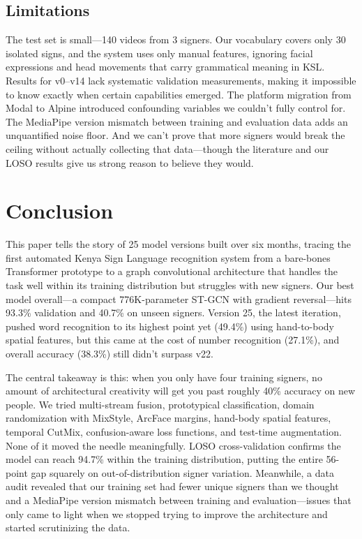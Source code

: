 \documentclass[conference]{IEEEtran}
\begin{document}
\subsection{Limitations}

The test set is small---140 videos from 3 signers. Our vocabulary covers only 30 isolated signs, and the system uses only manual features, ignoring facial expressions and head movements that carry grammatical meaning in KSL. Results for v0--v14 lack systematic validation measurements, making it impossible to know exactly when certain capabilities emerged. The platform migration from Modal to Alpine introduced confounding variables we couldn't fully control for. The MediaPipe version mismatch between training and evaluation data adds an unquantified noise floor. And we can't prove that more signers would break the ceiling without actually collecting that data---though the literature and our LOSO results give us strong reason to believe they would.

\section{Conclusion}

This paper tells the story of 25 model versions built over six months, tracing the first automated Kenya Sign Language recognition system from a bare-bones Transformer prototype to a graph convolutional architecture that handles the task well within its training distribution but struggles with new signers. Our best model overall---a compact 776K-parameter ST-GCN with gradient reversal---hits 93.3\% validation and 40.7\% on unseen signers. Version 25, the latest iteration, pushed word recognition to its highest point yet (49.4\%) using hand-to-body spatial features, but this came at the cost of number recognition (27.1\%), and overall accuracy (38.3\%) still didn't surpass v22.

The central takeaway is this: when you only have four training signers, no amount of architectural creativity will get you past roughly 40\% accuracy on new people. We tried multi-stream fusion, prototypical classification, domain randomization with MixStyle, ArcFace margins, hand-body spatial features, temporal CutMix, confusion-aware loss functions, and test-time augmentation. None of it moved the needle meaningfully. LOSO cross-validation confirms the model can reach 94.7\% within the training distribution, putting the entire 56-point gap squarely on out-of-distribution signer variation. Meanwhile, a data audit revealed that our training set had fewer unique signers than we thought and a MediaPipe version mismatch between training and evaluation---issues that only came to light when we stopped trying to improve the architecture and started scrutinizing the data.
\end{document}
